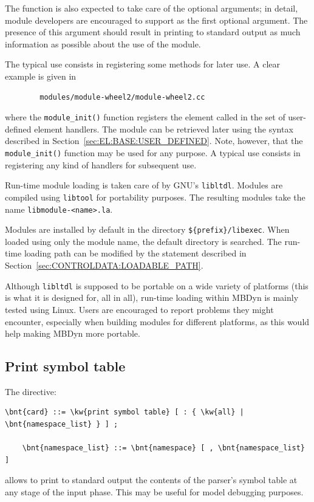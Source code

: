 The function is also expected to take care of the optional 
arguments; in detail, module developers are encouraged to support
 as the first optional argument.
The presence of this argument should result in printing to standard output
as much information as possible about the use of the module.

The typical use consists in registering some methods for later use.
A clear example is given in
\begin{verbatim}
        modules/module-wheel2/module-wheel2.cc
\end{verbatim}
where the \texttt{module\_init()} function registers
the  element called 
in the set of user-defined element handlers.
The module can be retrieved later using the syntax described
in Section~\ref{sec:EL:BASE:USER_DEFINED}.
Note, however, that the \texttt{module\_init()} function may be used
for any purpose.
A typical use consists in registering any kind of handlers
for subsequent use.

Run-time module loading is taken care of by GNU's \texttt{libltdl}.
Modules are compiled using \texttt{libtool} for portability purposes.
The resulting modules take the name
\texttt{libmodule-<name>.la}.

Modules are installed by default in the directory
\texttt{\$\{prefix\}/libexec}.
When loaded using only the module name, the default directory is searched.
The run-time loading path can be modified by the 
 statement described
in Section~\ref{sec:CONTROLDATA:LOADABLE_PATH}.

Although \texttt{libltdl} is supposed to be portable on a wide variety
of platforms (this is what it is designed for, all in all),
run-time loading within MBDyn is mainly tested using Linux.
Users are encouraged to report problems they might encounter,
especially when building modules for different platforms,
as this would help making MBDyn more portable.



\subsection{Print symbol table}
The  directive:
\begin{Verbatim}[commandchars=\\\{\}]
    \bnt{card} ::= \kw{print symbol table} [ : { \kw{all} | \bnt{namespace_list} } ] ;

    \bnt{namespace_list} ::= \bnt{namespace} [ , \bnt{namespace_list} ]
\end{Verbatim}
allows to print to standard output the contents of the parser's symbol
table at any stage of the input phase.
This may be useful for model debugging purposes.

